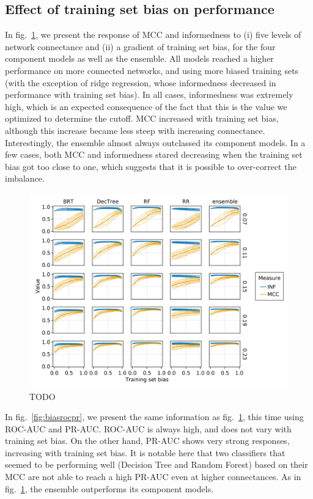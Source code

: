 \documentclass[11pt]{article}
\makeatletter
\def\maxwidth{\ifdim\Gin@nat@width>\linewidth\linewidth
\else\Gin@nat@width\fi}
\let\Oldincludegraphics\includegraphics
\renewcommand{\includegraphics}[1]{\Oldincludegraphics[width=\maxwidth]{#1}}
\makeatother
\begin{document}
\hypertarget{effect-of-training-set-bias-on-performance}{%
\subsection{Effect of training set bias on
performance}\label{effect-of-training-set-bias-on-performance}}

In fig.~\ref{fig:biasmccinf}, we present the response of MCC and
informedness to (i) five levels of network connectance and (ii) a
gradient of training set bias, for the four component models as well as
the ensemble. All models reached a higher performance on more connected
networks, and using more biased training sets (with the exception of
ridge regression, whose informedness decreased in performance with
training set bias). In all cases, informedness was extremely high, which
is an expected consequence of the fact that this is the value we
optimized to determine the cutoff. MCC increased with training set bias,
although this increase became less steep with increasing connectance.
Interestingly, the ensemble almost always outclassed its component
models. In a few cases, both MCC and informedness stared decreasing when
the training set bias got too close to one, which suggests that it is
possible to over-correct the imbalance.

\begin{figure}
\hypertarget{fig:biasmccinf}{%
\centering
\includegraphics{figures/bias_mcc_inf.png}
\caption{TODO}\label{fig:biasmccinf}
}
\end{figure}

In fig.~\ref{fig:biasrocpr}, we present the same information as
fig.~\ref{fig:biasmccinf}, this time using ROC-AUC and PR-AUC. ROC-AUC
is always high, and does not vary with training set bias. On the other
hand, PR-AUC shows very strong responses, increasing with training set
bias. It is notable here that two classifiers that seemed to be
performing well (Decision Tree and Random Forest) based on their MCC are
not able to reach a high PR-AUC even at higher connectances. As in
fig.~\ref{fig:biasmccinf}, the ensemble outperforms its component
models.
\end{document}
